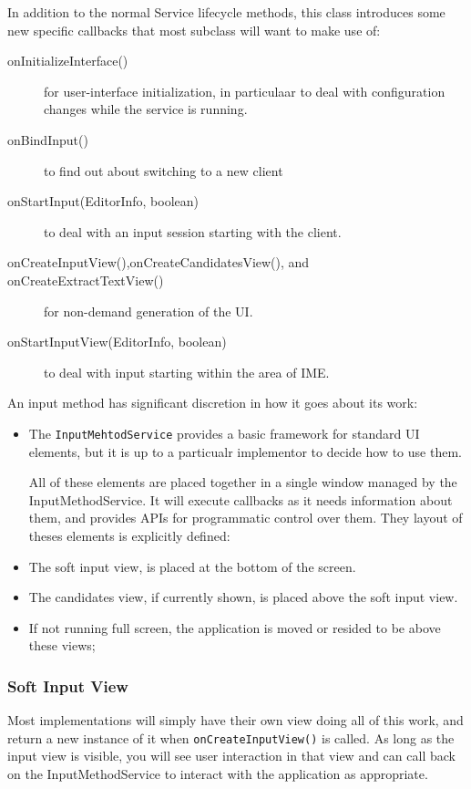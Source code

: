 \documentclass[11pt, a4paper]{book}
\begin{document}
In addition to the normal Service lifecycle methods, this class introduces some
new specific callbacks that most subclass will want to make use of:
\begin{description}
\item [onInitializeInterface()] for user-interface initialization, in
particulaar to deal with configuration changes while the service is running.
\item [onBindInput()] to find out about switching to a new client
\item [onStartInput(EditorInfo, boolean)] to deal with an input session starting
with the client.
\item [onCreateInputView(),onCreateCandidatesView(), and
onCreateExtractTextView()] for non-demand generation of the UI.
\item [onStartInputView(EditorInfo, boolean)] to deal with input starting within
the area of IME.
\end{description}
An input method has significant discretion in how it goes about its work:
\begin{itemize}
\item The \verb|InputMehtodService| provides a basic framework for standard UI
elements, but it is up to a particualr implementor to decide how to use them.

All of these elements are placed together in a single window managed by the
InputMethodService. It will execute callbacks as it needs information about
them, and provides APIs for programmatic control over them. They layout of theses
elements is explicitly defined:
\item The soft input view, is placed at the bottom of the screen.
\item The candidates view, if currently shown, is placed above the soft input
view.
\item If not running full screen, the application is moved or resided to be
above these views;
\end{itemize}

\subsubsection{Soft Input View}
Most implementations will simply have their own view doing all of this work, and
return a new instance of it when \verb|onCreateInputView()| is called. As long
as the input view is visible, you will see user interaction in that view and can
call back on the InputMethodService to interact with the application as
appropriate.
\end{document}
